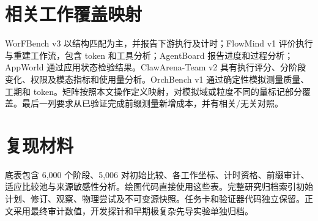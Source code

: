 \section{相关工作覆盖映射}

WorFBench v3 以结构匹配为主，并报告下游执行及计时；FlowMind v1 评价执行与重建工作流，包含 token 和工具分析；AgentBoard 报告进度和过程分析；AppWorld 通过应用状态检验结果。ClawArena-Team v2 具有执行评分、分阶段变化、权限及模态指标和使用量分析。OrchBench v1 通过确定性模拟测量质量、工期和 token。矩阵按照本文操作定义映射，对模拟域或粒度不同的量标记部分覆盖。最后一列要求从已验证完成前缀测量新增成本，并有相关/无关对照。

\section{复现材料}
底表包含 6,000 个阶段、5,006 对初始比较、各工作坐标、计时资格、前缀审计、适应比较池与来源敏感性分析。绘图代码直接使用这些表。完整研究归档索引初始计划、修订、观察、物理尝试及不可变源快照。任务卡和验证器代码独立保留。正文采用最终审计数值，开发探针和早期极复杂先导实验单独归档。
